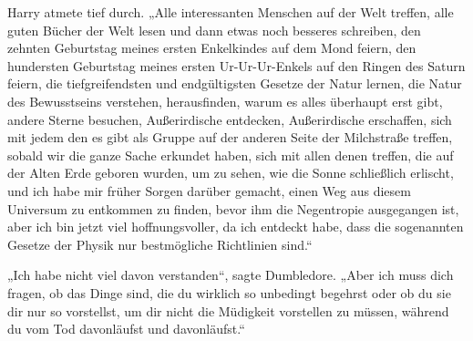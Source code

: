 Harry atmete tief durch. „Alle interessanten Menschen auf der Welt treffen, alle guten Bücher der Welt lesen und dann etwas noch besseres schreiben, den zehnten Geburtstag meines ersten Enkelkindes auf dem Mond feiern, den hundersten Geburtstag meines ersten Ur-Ur-Ur-Enkels auf den Ringen des Saturn feiern, die tiefgreifendsten und endgültigsten Gesetze der Natur lernen, die Natur des Bewusstseins verstehen, herausfinden, warum es alles überhaupt erst gibt, andere Sterne besuchen, Außerirdische entdecken, Außerirdische erschaffen, sich mit jedem den es gibt als Gruppe auf der anderen Seite der Milchstraße treffen, sobald wir die ganze Sache erkundet haben, sich mit allen denen treffen, die auf der Alten Erde geboren wurden, um zu sehen, wie die Sonne schließlich erlischt, und ich habe mir früher Sorgen darüber gemacht, einen Weg aus diesem Universum zu entkommen zu finden, bevor ihm die Negentropie ausgegangen ist, aber ich bin jetzt viel hoffnungsvoller, da ich entdeckt habe, dass die sogenannten Gesetze der Physik nur bestmögliche Richtlinien sind.“%

„Ich habe nicht viel davon verstanden“, sagte Dumbledore. „Aber ich muss dich fragen, ob das Dinge sind, die du wirklich so unbedingt begehrst oder ob du sie dir nur so vorstellst, um dir nicht die Müdigkeit vorstellen zu müssen, während du vom Tod davonläufst und davonläufst.“

